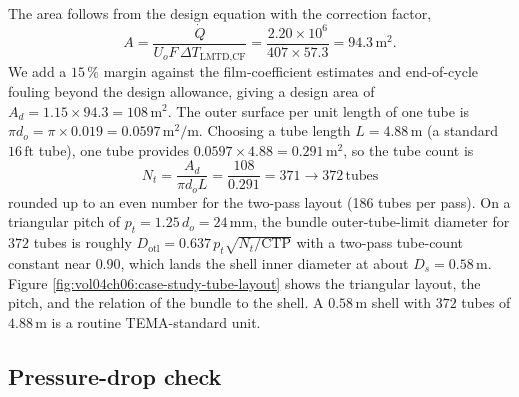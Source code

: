 The area follows from the design equation with the correction factor,
\[
A = \frac{\dot{Q}}{U_o F\,\Delta T_{\text{LMTD,CF}}} = \frac{2.20\times
10^6}{407 \times 57.3} = 94.3\,\text{m}^2.
\]
We add a $15\,\%$ margin against the film-coefficient estimates and
end-of-cycle fouling beyond the design allowance, giving a design area
of $A_d = 1.15 \times 94.3 = 108\,\text{m}^2$. The outer surface per
unit length of one tube is $\pi d_o = \pi \times 0.019 = 0.0597\,\text{
m}^2/\text{m}$. Choosing a tube length $L = 4.88\,\text{m}$ (a standard
$16\,\text{ft}$ tube), one tube provides $0.0597 \times 4.88 = 0.291\,
\text{m}^2$, so the tube count is
\[
N_t = \frac{A_d}{\pi d_o L} = \frac{108}{0.291} = 371 \to 372\,\text{
tubes}
\]
rounded up to an even number for the two-pass layout (186 tubes per
pass). On a triangular pitch of $p_t = 1.25\,d_o = 24\,\si{\milli\meter}$,
the bundle outer-tube-limit diameter for $372$ tubes is roughly
$D_{\text{otl}} = 0.637\,p_t\sqrt{N_t/\text{CTP}}$ with a two-pass
tube-count constant near $0.90$, which lands the shell inner diameter at
about $D_s = 0.58\,\text{m}$. Figure
\ref{fig:vol04ch06:case-study-tube-layout} shows the triangular layout,
the pitch, and the relation of the bundle to the shell. A $0.58\,\text{m}$
shell with $372$ tubes of $4.88\,\text{m}$ is a routine TEMA-standard
unit.



\subsection{Pressure-drop check}

